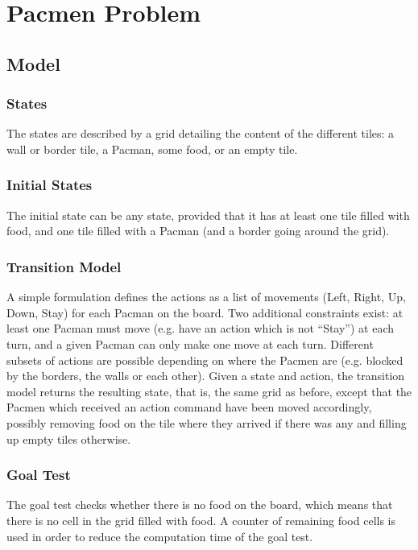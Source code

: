 \documentclass[journal]{IEEEtran}
\begin{document}
\section{Pacmen Problem}
\subsection{Model}
\subsubsection{States}
The states are described by a grid detailing the content of the different tiles: a wall or border tile, a Pacman, some food, or an empty tile.
\subsubsection{Initial States}
The initial state can be any state, provided that it has at least one tile filled with food, and one tile filled with a Pacman (and a border going around the grid).

\subsubsection{Transition Model}
A simple formulation defines the actions as a list of movements (Left, Right, Up, Down, Stay) for each Pacman on the board.
Two additional constraints exist: at least one Pacman must move (e.g. have an action which is not ``Stay'') at each turn, and a given Pacman can only make one move at each turn.
Different subsets of actions are possible depending on where the Pacmen are (e.g. blocked by the borders, the walls or each other). 
Given a state and action, the transition model returns the resulting state, that is, the same grid as before, except that the Pacmen which received an action command have been moved accordingly, possibly removing food on the tile where they arrived if there was any and filling up empty tiles otherwise.

\subsubsection{Goal Test}
The goal test checks whether there is no food on the board, which means that there is no cell in the grid filled with food.
A counter of remaining food cells is used in order to reduce the computation time of the goal test.
\end{document}
